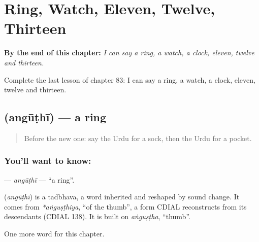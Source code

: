 
\chapter{Ring, Watch, Eleven, Twelve, Thirteen}
\label{ch:ur-ring-watch-eleven-twelve-thirteen}

\begin{chapteropening}
\textbf{By the end of this chapter:} \emph{I can say a ring, a watch, a clock, eleven, twelve and thirteen.}

Complete the last lesson of chapter 83: I can say a ring, a watch, a clock, eleven, twelve and thirteen.
\end{chapteropening}

\section[\texorpdfstring{\ur{انگوٹھی} (angūṭhī)}{انگوٹھی (angūṭhī)}]{ (angūṭhī) — a ring}

\label{lesson:UR-C83-anguthi}



\begin{quote}
Before the new one: say the Urdu for a sock, then the Urdu for a pocket.
\end{quote}

\subsection*{You'll want to know: }
\textbf{} — \emph{angūṭhī} — \textquotedblleft{}a ring\textquotedblright{}.

\begin{cousinweb}
\textbf{} (\emph{angūṭhī}) is a tadbhava, a word inherited and reshaped by sound change. It comes from \emph{*aṅguṣṭhiya}, \textquotedblleft{}of the thumb\textquotedblright{}, a form CDIAL reconstructs from its descendants (CDIAL 138). It is built on \emph{aṅguṣṭha}, \textquotedblleft{}thumb\textquotedblright{}.
\end{cousinweb}

\begin{grammarlens}[title={What you've built}]
One more word for this chapter.
\end{grammarlens}

